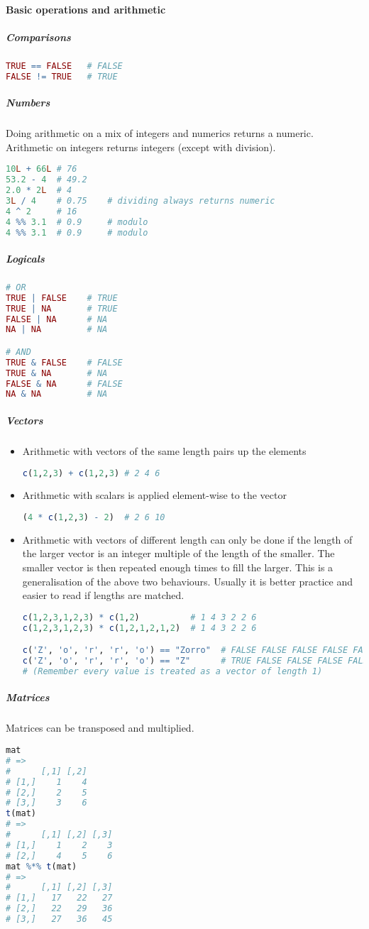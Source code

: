 \paragraph{Basic operations and arithmetic}
\subparagraph{Comparisons}
\begin{lstlisting}[language={r}, style=snippet]
TRUE == FALSE   # FALSE
FALSE != TRUE   # TRUE
\end{lstlisting}
\subparagraph{Numbers} Doing arithmetic on a mix of integers and numerics returns a numeric. Arithmetic on integers returns integers (except with division).
\begin{lstlisting}[language={r}, style=snippet]
10L + 66L # 76
53.2 - 4  # 49.2
2.0 * 2L  # 4
3L / 4    # 0.75    # dividing always returns numeric
4 ^ 2     # 16
4 %% 3.1  # 0.9     # modulo
4 %% 3.1  # 0.9     # modulo
\end{lstlisting}
\subparagraph{Logicals}
\begin{lstlisting}[language={r}, style=snippet]
# OR
TRUE | FALSE    # TRUE
TRUE | NA       # TRUE
FALSE | NA      # NA
NA | NA         # NA

# AND
TRUE & FALSE    # FALSE
TRUE & NA       # NA
FALSE & NA      # FALSE
NA & NA         # NA
\end{lstlisting}
\subparagraph{Vectors}
\begin{itemize}
\item Arithmetic with vectors of the same length pairs up the elements
\begin{lstlisting}[language={r}, style=snippet]
c(1,2,3) + c(1,2,3) # 2 4 6
\end{lstlisting}
\item Arithmetic with scalars is applied element-wise to the vector
\begin{lstlisting}[language={r}, style=snippet]
(4 * c(1,2,3) - 2)  # 2 6 10
\end{lstlisting}
\item Arithmetic with vectors of different length can only be done if the length of the larger vector is an integer multiple of the length of the smaller. The smaller vector is then repeated enough times to fill the larger. This is a generalisation of the above two behaviours. Usually it is better practice and easier to read if lengths are matched.
\begin{lstlisting}[language={r}, style=snippet]
c(1,2,3,1,2,3) * c(1,2)          # 1 4 3 2 2 6
c(1,2,3,1,2,3) * c(1,2,1,2,1,2)  # 1 4 3 2 2 6

c('Z', 'o', 'r', 'r', 'o') == "Zorro"  # FALSE FALSE FALSE FALSE FALSE
c('Z', 'o', 'r', 'r', 'o') == "Z"      # TRUE FALSE FALSE FALSE FALSE
# (Remember every value is treated as a vector of length 1)
\end{lstlisting}
\end{itemize}
\subparagraph{Matrices}
Matrices can be transposed and multiplied.
\begin{lstlisting}[language={r}, style=snippet]
mat
# =>
#      [,1] [,2]
# [1,]    1    4
# [2,]    2    5
# [3,]    3    6
t(mat)
# =>
#      [,1] [,2] [,3]
# [1,]    1    2    3
# [2,]    4    5    6
mat %*% t(mat)
# =>
#      [,1] [,2] [,3]
# [1,]   17   22   27
# [2,]   22   29   36
# [3,]   27   36   45
\end{lstlisting}

